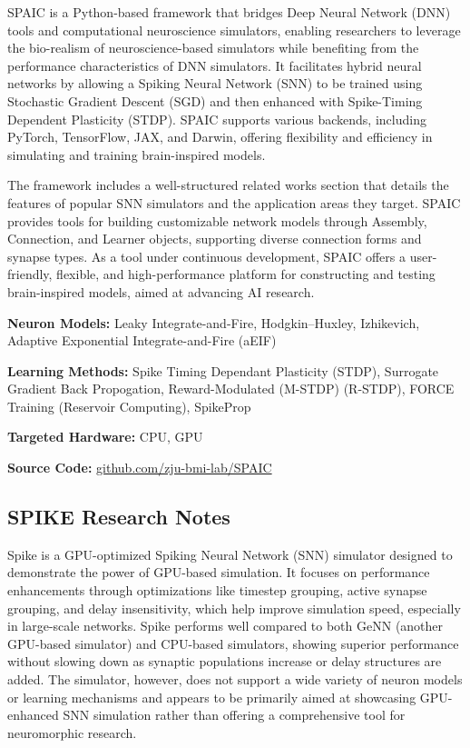 SPAIC is a Python-based framework that bridges Deep Neural Network (DNN) tools and computational neuroscience simulators, enabling researchers to leverage the bio-realism of neuroscience-based simulators while benefiting from the performance characteristics of DNN simulators. It facilitates hybrid neural networks by allowing a Spiking Neural Network (SNN) to be trained using Stochastic Gradient Descent (SGD) and then enhanced with Spike-Timing Dependent Plasticity (STDP). SPAIC supports various backends, including PyTorch, TensorFlow, JAX, and Darwin, offering flexibility and efficiency in simulating and training brain-inspired models.

The framework includes a well-structured related works section that details the features of popular SNN simulators and the application areas they target. SPAIC provides tools for building customizable network models through Assembly, Connection, and Learner objects, supporting diverse connection forms and synapse types. As a tool under continuous development, SPAIC offers a user-friendly, flexible, and high-performance platform for constructing and testing brain-inspired models, aimed at advancing AI research.

\begin{tcolorbox}[enhanced,attach boxed title to top center={yshift=-3mm,yshifttext=-1mm}, colback=blue!5!white,colframe=blue!75!black,colbacktitle=red!80!black, title=SPAIC at a Glance,fonttitle=\bfseries, boxed title style={size=small,colframe=red!50!black} ]

\textbf{Neuron Models:} Leaky Integrate-and-Fire, Hodgkin–Huxley, Izhikevich, Adaptive Exponential  Integrate-and-Fire (aEIF)

\textbf{Learning Methods:} Spike Timing Dependant Plasticity (STDP), Surrogate Gradient Back Propogation, Reward-Modulated (M-STDP) (R-STDP), FORCE Training (Reservoir Computing), SpikeProp  

\textbf{Targeted Hardware:} CPU, GPU 

\textbf{Source Code:} \href{https://github.com/zju-bmi-lab/SPAIC}{github.com/zju-bmi-lab/SPAIC}
\end{tcolorbox}
\subsection*{SPIKE Research Notes}\label{SPIKE}

Spike is a GPU-optimized Spiking Neural Network (SNN) simulator designed to demonstrate the power of GPU-based simulation. It focuses on performance enhancements through optimizations like timestep grouping, active synapse grouping, and delay insensitivity, which help improve simulation speed, especially in large-scale networks. Spike performs well compared to both GeNN (another GPU-based simulator) and CPU-based simulators, showing superior performance without slowing down as synaptic populations increase or delay structures are added. The simulator, however, does not support a wide variety of neuron models or learning mechanisms and appears to be primarily aimed at showcasing GPU-enhanced SNN simulation rather than offering a comprehensive tool for neuromorphic research.

